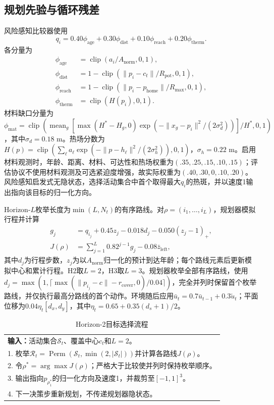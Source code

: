 \documentclass[conference]{IEEEtran}
\begin{document}
\subsection{规划先验与循环残差}
风险感知比较器使用
\begin{equation}
q_i=0.40\phi_{\mathrm{age}}+0.30\phi_{\mathrm{dist}}
 +0.10\phi_{\mathrm{reach}}+0.20\phi_{\mathrm{therm}}.
\end{equation}
各分量为
\begin{align}
\phi_{\mathrm{age}}&=\operatorname{clip}(a_i/A_{\mathrm{norm}},0,1),\nonumber\\
\phi_{\mathrm{dist}}&=1-\operatorname{clip}(\|p_i-c_t\|/R_{\mathrm{pot}},0,1),\nonumber\\
\phi_{\mathrm{reach}}&=1-\operatorname{clip}(\|p_i-p_{\mathrm{home}}\|/R_{\max},0,1),\nonumber\\
\phi_{\mathrm{therm}}&=\operatorname{clip}(H(p_i),0,1).
\end{align}
材料缺口分量为$\phi_{\mathrm{mat}}=\operatorname{clip}(\operatorname{mean}_g[\max(H^*-H_g,0)\exp(-\|x_g-p_i\|^2/(2\sigma_d^2))]/H^*,0,1)$，其中$\sigma_d=0.18$ m。热场分数为$H(p)=\operatorname{clip}(\sum_\ell a_\ell\exp(-\|p-h_\ell\|^2/(2\sigma_h^2)),0,1)$，$\sigma_h=0.22$ m。启用材料观测时，年龄、距离、材料、可达性和热场权重为$(.35,.25,.15,.10,.15)$；评估协议不使用材料观测及可选紧迫度增强，故实际权重为$(.40,.30,0,.10,.20)$。风险感知启发式无隐状态，选择活动集合中首个取得最大$q_i$的热斑，并以速度1输出指向该目标的归一化方向。

Horizon-$L$枚举长度为$\min(L,N_t)$的有序路线。对$\rho=(i_1,\ldots,i_L)$，规划器模拟行程并计算
\begin{align}
g_j &= q_{i_j}+0.45z_j-0.018d_j-0.050(z_j-1)_+,\nonumber\\
J(\rho) &= \sum_{j=1}^{L}0.82^{j-1}g_j-0.08\bar z_{\mathrm{left}},
\end{align}
其中$d_j$为行程步数，$z_j$为以$A_{\mathrm{norm}}$归一化的预计到达年龄；每个路线元素后更新模拟中心和累计行程。H2取$L=2$，H3取$L=3$。规划器枚举全部有序路线，使用$d_j=\max(1,\lceil\max(\|p_{i_j}-c\|-r_{\mathrm{cover}},0)/0.04\rceil)$，完全并列时保留首个枚举路线，并仅执行最高分路线的首个动作。环境随后应用$\bar u_t=0.7\bar u_{t-1}+0.3\tilde u_t$；平面位移为$0.04\eta_t[d_x,d_y]$，其中$\eta_t=0.65+0.35(d_s+1)/2$。

\begin{table}[t]
\caption{Horizon-2目标选择流程}
\label{tab:h2algorithm_zh}
\centering\scriptsize
\begin{tabular}{@{}p{}@{}}
\toprule
\textbf{输入：}活动集合$\mathcal S_t$、覆盖中心$c_t$和$L=2$。\\
1. 枚举$\mathcal R_t=\operatorname{Perm}(\mathcal S_t,\min(2,|\mathcal S_t|))$并计算各路线$J(\rho)$。\\
2. 令$\rho^*=\arg\max J(\rho)$；严格大于比较使并列时保持枚举顺序。\\
3. 输出指向$p_{\rho^*_1}$的归一化方向及速度1，并裁剪至$[-1,1]^3$。\\
4. 下一决策步重新规划，不传递规划器隐状态。\\
\bottomrule
\end{tabular}
\end{table}
\end{document}
